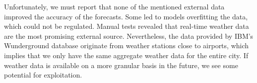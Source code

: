 \vskip 0.1in

Unfortunately, we must report that none of the mentioned external data
    improved the accuracy of the forecasts.
Some led to models overfitting the data, which could not be regulated.
Manual tests revealed that real-time weather data are the most promising
    external source.
Nevertheless, the data provided by IBM's Wunderground database originate from
    weather stations close to airports, which implies that we only have the
    same aggregate weather data for the entire city.
If weather data is available on a more granular basis in the future, we see
    some potential for exploitation.
